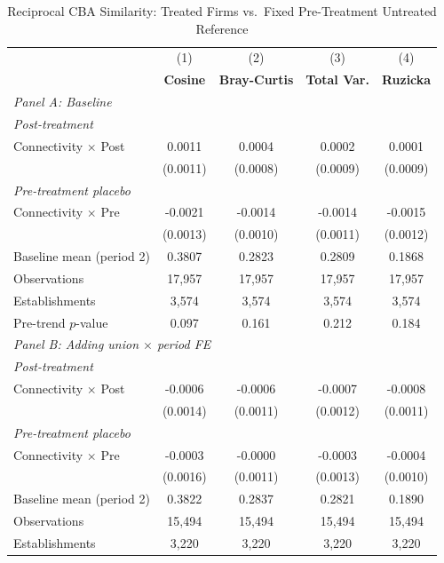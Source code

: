 \begin{table}[H]
\centering
\caption{Reciprocal CBA Similarity: Treated Firms vs.\ Fixed Pre-Treatment Untreated Reference}
\label{tab:treated_pretreat_ref_cba_similarity}
\scriptsize
\setlength{\tabcolsep}{8pt}
\begin{tabular}{lcccc}
\toprule\toprule
 & (1) & (2) & (3) & (4) \\
 & \textbf{Cosine} & \textbf{Bray-Curtis} & \textbf{Total Var.} & \textbf{Ruzicka} \\
\midrule
\multicolumn{5}{l}{\textit{Panel A: Baseline}} \\
\multicolumn{5}{l}{\textit{Post-treatment}} \\
Connectivity $\times$ Post & 0.0011 & 0.0004 & 0.0002 & 0.0001 \\
 & (0.0011) & (0.0008) & (0.0009) & (0.0009) \\
\multicolumn{5}{l}{\textit{Pre-treatment placebo}} \\
Connectivity $\times$ Pre & -0.0021 & -0.0014 & -0.0014 & -0.0015 \\
 & (0.0013) & (0.0010) & (0.0011) & (0.0012) \\
\midrule
Baseline mean (period 2) & 0.3807 & 0.2823 & 0.2809 & 0.1868 \\
Observations &       17,957 &       17,957 &       17,957 &       17,957 \\
Establishments &        3,574 &        3,574 &        3,574 &        3,574 \\
Pre-trend $p$-value & 0.097 & 0.161 & 0.212 & 0.184 \\
\midrule
\multicolumn{5}{l}{\textit{Panel B: Adding union $\times$ period FE}} \\
\multicolumn{5}{l}{\textit{Post-treatment}} \\
Connectivity $\times$ Post & -0.0006 & -0.0006 & -0.0007 & -0.0008 \\
 & (0.0014) & (0.0011) & (0.0012) & (0.0011) \\
\multicolumn{5}{l}{\textit{Pre-treatment placebo}} \\
Connectivity $\times$ Pre & -0.0003 & -0.0000 & -0.0003 & -0.0004 \\
 & (0.0016) & (0.0011) & (0.0013) & (0.0010) \\
\midrule
Baseline mean (period 2) & 0.3822 & 0.2837 & 0.2821 & 0.1890 \\
Observations &       15,494 &       15,494 &       15,494 &       15,494 \\
Establishments &        3,220 &        3,220 &        3,220 &        3,220 \\

\end{tabular}
\end{table}
